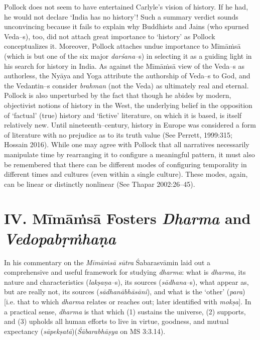 Pollock does not seem to have entertained Carlyle’s vision of history. If he had, he would not declare ‘India has no history’! Such a summary verdict sounds unconvincing because it fails to explain why Buddhists and Jains (who spurned Veda–s), too, did not attach great importance to ‘history’ as Pollock conceptualizes it. Moreover, Pollock attaches undue importance to Mīmāṁsā (which is but one of the six major \textit{darśana–}s) in selecting it as a guiding light in his search for history in India. As against the Mīmāṁsā view of the Veda–s as authorless, the Nyāya and Yoga attribute the authorship of Veda–s to God, and the Vedantin–s consider \textit{brahman} (not the Veda) as ultimately real and eternal. Pollock is also unperturbed by the fact that though he abides by modern, objectivist notions of history in the West, the underlying belief in the opposition of ‘factual’ (true) history and ‘fictive’ literature, on which it is based, is itself relatively new. Until nineteenth–century, history in Europe was considered a form of literature with no prejudice as to its truth value (See Perrett, 1999:315; Hossain 2016). While one may agree with Pollock that all narratives necessarily manipulate time by rearranging it to configure a meaningful pattern, it must also be remembered that there can be different modes of configuring temporality in different times and cultures (even within a single culture). These modes, again, can be linear or distinctly nonlinear (See Thapar 2002:26–45).


\section*{IV. Mīmāṁsā Fosters \textit{Dharma} and \textit{Vedopabṛṁhaṇa}}

In his commentary on the \textit{Mīmāṁsā sūtra} Śabarasvāmin laid out a comprehensive and useful framework for studying \textit{dharma}: what is \textit{dharma}, its nature and characteristics (\textit{lakṣaṇa–}s), its sources (\textit{sādhana–}s), what appear as, but are really not, its sources (\textit{sādhanābhāsāni}), and what is the ‘other’ (\textit{para}) [i.e. that to which \textit{dharma} relates or reaches out; later identified with \textit{mokṣa}]. In a practical sense, \textit{dharma} is that which (1) sustains the universe, (2) supports, and (3) upholds all human efforts to live in virtue, goodness, and mutual expectancy (\textit{sāpekṣatā})(\textit{Śābarabhāṣya} on MS 3:3.14).

